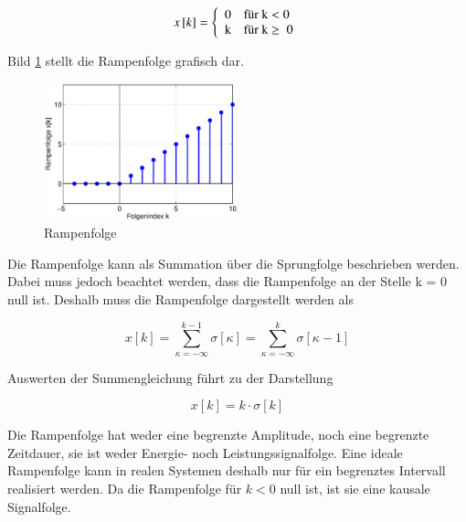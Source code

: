 \begin{equation}\label{eq:threethirtyseven}
x\left[k\right]=\left\{\begin{array}{l} {0\quad \text{für k} <0} \\ 
{\text{k}\quad \text{für k} \ge \rm \; 0} \end{array}\right. 
\end{equation}

\noindent Bild \ref{fig:Rampenfolge} stellt die Rampenfolge grafisch dar.

\begin{figure}[H]
  \centerline{\includegraphics[width=0.5\textwidth]{Kapitel3/Bilder/image12.eps}}
  \caption{Rampenfolge}
  \label{fig:Rampenfolge}
\end{figure}

\noindent Die Rampenfolge kann als Summation \"{u}ber die Sprungfolge beschrieben werden. Dabei muss jedoch beachtet werden, dass die Rampenfolge an der Stelle k = 0 null ist. Deshalb muss die Rampenfolge dargestellt werden als 

\begin{equation}\label{eq:threethirtyeight}
x\left[k\right]=\sum _{\kappa =-\infty }^{k-1}\sigma \left[\kappa \right] =\sum _{\kappa =-\infty }^{k}\sigma \left[\kappa -1\right]
\end{equation}

\noindent Auswerten der Summengleichung führt zu der Darstellung

\begin{equation}\label{eq:threethirtynine}
x\left[k\right]=k\cdot \sigma \left[k\right]
\end{equation}

\noindent Die Rampenfolge hat weder eine begrenzte Amplitude, noch eine begrenzte Zeitdauer, sie ist weder Energie- noch Leistungssignalfolge. Eine ideale Rampenfolge kann in realen Systemen deshalb nur f\"{u}r ein begrenztes Intervall realisiert werden. Da die Rampenfolge f\"{u}r $k \mathrm{<} 0$ null ist, ist sie eine kausale Signalfolge.

